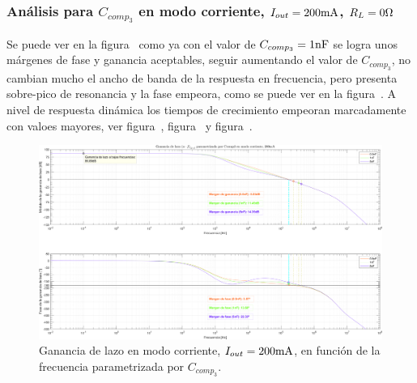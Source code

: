 \clearpage


\subsubsection{Análisis para $C_{comp_{3}}$ en modo corriente, $I_{out} = 200 \si[per-mode=symbol]{\milli\ampere}$, $R_{L} = 0 \si[per-mode=symbol]{\ohm}$}

Se puede ver en la figura~ como ya con el valor de $C_{comp_{3}} = 1 \si[per-mode=symbol]{\nano\farad}$ se logra unos márgenes de fase y ganancia aceptables, seguir aumentando el valor de $C_{comp_{3}}$, no cambian mucho el ancho de banda de la respuesta en frecuencia, pero presenta sobre-pico de resonancia y la fase empeora, como se puede ver en la figura~. A nivel de respuesta dinámica los tiempos de crecimiento empeoran marcadamente con valoes mayores, ver figura~, figura~ y figura~.

\vfill



\clearpage

\begin{figure}[H] %
\begin{center}
\includegraphics[width=1.1 \textwidth, angle=90]{./img/plots/loop/power_supply_CCOMP3_LOOP_Modo4.png}
\caption{\label{fig:fig_power_supply_CCOMP3_LOOP_Modo4}\footnotesize{Ganancia de lazo en modo corriente, $I_{out} = 200 \si[per-mode=symbol]{\milli\ampere}$, en función de la frecuencia parametrizada por $C_{comp_{3}}$.}}
\end{center}
\end{figure}


